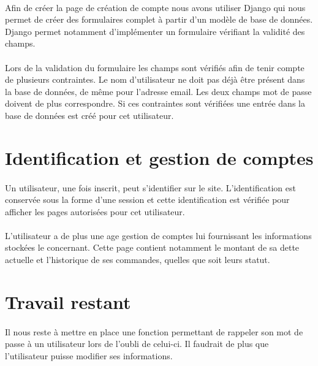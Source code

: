 \documentclass[twoside,UTF8]{EPURapport}
\begin{document}
        \paragraph{}Afin de créer la page de création de compte nous avons utiliser Django qui nous permet de créer des formulaires complet à partir d'un modèle de base de données. Django permet notamment d'implémenter un formulaire vérifiant la validité des champs.

        \paragraph{}Lors de la validation du formulaire les champs sont vérifiés afin de tenir compte de plusieurs contraintes. Le nom d'utilisateur ne doit pas déjà être présent dans la base de données, de même pour l'adresse email. Les deux champs mot de passe doivent de plus correspondre. Si ces contraintes sont vérifiées une entrée dans la base de données est créé pour cet utilisateur.

    \section{Identification et gestion de comptes}

        \paragraph{}Un utilisateur, une fois inscrit, peut s'identifier sur le site. L'identification est conservée sous la forme d'une session et cette identification est vérifiée pour afficher les pages autorisées pour cet utilisateur.

        \paragraph{}L'utilisateur a de plus une age gestion de comptes lui fournissant les informations stockées le concernant. Cette page contient notamment le montant de sa dette actuelle et l'historique de ses commandes, quelles que soit leurs statut.

    \section{Travail restant}
        
        \paragraph{}Il nous reste à mettre en place une fonction permettant de rappeler son mot de passe à un utilisateur lors de l'oubli de celui-ci. Il faudrait de plus que l'utilisateur puisse modifier ses informations.
\end{document}
